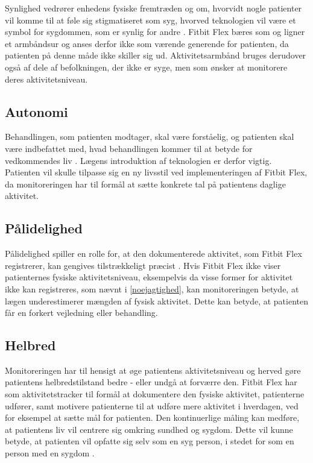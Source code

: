Synlighed vedrører enhedens fysiske fremtræden og om, hvorvidt nogle patienter vil komme til at føle sig stigmatiseret som syg, hvorved teknologien vil være et symbol for sygdommen, som er synlig for andre \citep{Mittelstand2011}. Fitbit Flex bæres som og ligner et armbåndsur og anses derfor ikke som værende generende for patienten, da patienten på denne måde ikke skiller sig ud. Aktivitetsarmbånd bruges derudover også af dele af befolkningen, der ikke er syge, men som ønsker at monitorere deres aktivitetsniveau. 

\subsection{Autonomi}

Behandlingen, som patienten modtager, skal være forståelig, og patienten skal være indbefattet med, hvad behandlingen kommer til at betyde for vedkommendes liv \citep{Mittelstand2011}. Lægens introduktion af teknologien er derfor vigtig. Patienten vil skulle tilpasse sig en ny livsstil ved implementeringen af Fitbit Flex, da monitoreringen har til formål at sætte konkrete tal på patientens daglige aktivitet.

\subsection{Pålidelighed}

Pålidelighed spiller en rolle for, at den dokumenterede aktivitet, som Fitbit Flex registrerer, kan gengives tilstrækkeligt præcist \citep{Nordgren2013}.
Hvis Fitbit Flex ikke viser patienternes fysiske aktivitetsniveau, eksempelvis da visse former for aktivitet ikke kan registreres, som nævnt i \autoref{noejagtighed}, kan monitoreringen betyde, at lægen underestimerer mængden af fysisk aktivitet. Dette kan betyde, at patienten får en forkert vejledning eller behandling. 
 
\subsection{Helbred}

Monitoreringen har til hensigt at øge patientens aktivitetsniveau og herved gøre patientens helbredstilstand bedre - eller undgå at forværre den. Fitbit Flex har som aktivitetstracker til formål at dokumentere den fysiske aktivitet, patienterne udfører, samt motivere patienterne til at udføre mere aktivitet i hverdagen, ved for eksempel at sætte mål for patienten. Den kontinuerlige måling kan medføre, at patientens liv vil centrere sig omkring sundhed og sygdom. Dette vil kunne betyde, at patienten vil opfatte sig selv som en syg person, i stedet for som en person med en sygdom \citep{Nordgren2013}.

